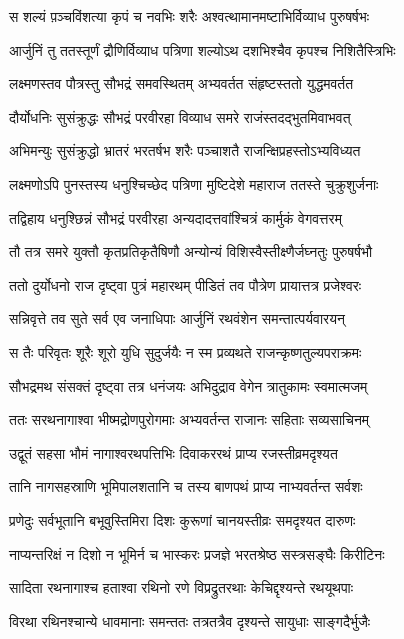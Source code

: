 \twolineshloka
{स शल्यं प़ञ्चविंशत्या कृपं च नवभिः शरैः}
{अश्वत्थामानमष्टाभिर्विव्याध पुरुषर्षभः}


\twolineshloka
{आर्जुनिं तु ततस्तूर्णं द्रौणिर्विव्याध पत्रिणा}
{शल्योऽथ दशभिश्चैव कृपश्च निशितैस्त्रिभिः}


\twolineshloka
{लक्ष्मणस्तव पौत्रस्तु सौभद्रं समवस्थितम्}
{अभ्यवर्तत संहृष्टस्ततो युद्धमवर्तत}


\twolineshloka
{दौर्योधनिः सुसंक्रुद्धः सौभद्रं परवीरहा}
{विव्याध समरे राजंस्तदद्भुतमिवाभवत्}


\twolineshloka
{अभिमन्युः सुसंक्रुद्धो भ्रातरं भरतर्षभ}
{शरैः पञ्चाशतै राजन्क्षिप्रहस्तोऽभ्यविध्यत}


\twolineshloka
{लक्ष्मणोऽपि पुनस्तस्य धनुश्चिच्छेद पत्रिणा}
{मुष्टिदेशे महाराज ततस्ते चुक्रुशुर्जनाः}


\twolineshloka
{तद्विहाय धनुश्छिन्नं सौभद्रं परवीरहा}
{अन्यदादत्तवांश्चित्रं कार्मुकं वेगवत्तरम्}


\twolineshloka
{तौ तत्र समरे युक्तौ कृतप्रतिकृतैषिणौ}
{अन्योन्यं विशिस्वैस्तीक्ष्णैर्जघ्नतुः पुरुषर्षभौ}


\twolineshloka
{ततो दुर्योधनो राज दृष्ट्वा पुत्रं महारथम्}
{पीडितं तव पौत्रेण प्रायात्तत्र प्रजेश्वरः}


\twolineshloka
{सन्निवृत्ते तव सुते सर्व एव जनाधिपाः}
{आर्जुनिं रथवंशेन समन्तात्पर्यवारयन्}


\twolineshloka
{स तैः परिवृतः शूरैः शूरो युधि सुदुर्जयैः}
{न स्म प्रव्यथते राजन्कृष्णतुल्यपराक्रमः}


\twolineshloka
{सौभद्रमथ संसक्तं दृष्ट्वा तत्र धनंजयः}
{अभिदुद्राव वेगेन त्रातुकामः स्वमात्मजम्}


\twolineshloka
{ततः सरथनागाश्वा भीष्मद्रोणपुरोगमाः}
{अभ्यवर्तन्त राजानः सहिताः सव्यसाचिनम्}


\twolineshloka
{उद्वूतं सहसा भौमं नागाश्वरथपत्तिभिः}
{दिवाकररथं प्राप्य रजस्तीव्रमदृश्यत}


\twolineshloka
{तानि नागसहस्राणि भूमिपालशतानि च}
{तस्य बाणपथं प्राप्य नाभ्यवर्तन्त सर्वशः}


\twolineshloka
{प्रणेदुः सर्वभूतानि बभूवुस्तिमिरा दिशः}
{कुरूणां चानयस्तीव्रः समदृश्यत दारुणः}


\twolineshloka
{नाप्यन्तरिक्षं न दिशो न भूमिर्न च भास्करः}
{प्रजज्ञे भरतश्रेष्ठ सस्त्रसङ्घैः किरीटिनः}


\twolineshloka
{सादिता रथनागाश्च हताश्वा रथिनो रणे}
{विप्रद्रुतरथाः केचिद्दृश्यन्ते रथयूथपाः}


\twolineshloka
{विरथा रथिनश्चान्ये धावमानाः समन्ततः}
{तत्रतत्रैव दृश्यन्ते सायुधाः साङ्गदैर्भुजैः}


